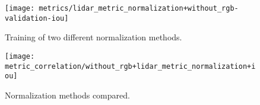 \begin{figure}[H]
  \centering
  \texttt{[image: metrics/lidar\_metric\_normalization+without\_rgb-validation-iou]}
  \caption{%
    Training of two different normalization methods.
  }
\end{figure}

\begin{figure}[H]
  \centering
  \texttt{[image: metric\_correlation/without\_rgb+lidar\_metric\_normalization+iou]}
  \caption{%
    Normalization methods compared.
  }
\end{figure}

